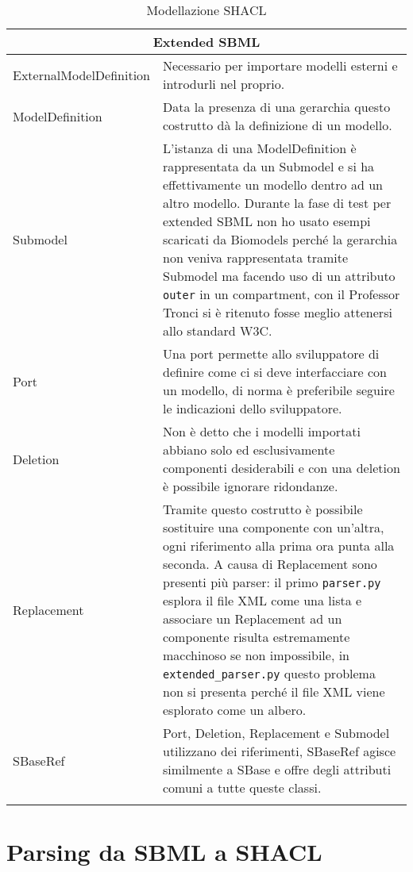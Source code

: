 \documentclass{article}
\begin{document}
\begin{longtable}{p{}p{}}
    \hline 
    \multicolumn{2}{c}{Extended SBML} \\
    \hline
    ExternalModelDefinition &  Necessario per importare modelli esterni e introdurli nel proprio. \\
    \hline
    ModelDefinition & Data la presenza di una gerarchia questo costrutto dà la definizione di un modello. \\ 
    \hline
    Submodel & L'istanza di una ModelDefinition è rappresentata da un Submodel e si ha effettivamente un modello dentro ad un altro modello. Durante la fase di test per extended SBML non ho usato esempi scaricati da Biomodels perché la gerarchia non veniva rappresentata tramite Submodel ma facendo uso di un attributo \texttt{outer} in un compartment, con il Professor Tronci si è ritenuto fosse meglio attenersi allo standard W3C. \\ 
    \hline
    Port & Una port permette allo sviluppatore di definire come ci si deve interfacciare con un modello, di norma è preferibile seguire le indicazioni dello sviluppatore. \\ 
    \hline
    Deletion & Non è detto che i modelli importati abbiano solo ed esclusivamente componenti desiderabili e con una deletion è possibile ignorare ridondanze. \\
    \hline
    Replacement & Tramite questo costrutto è possibile sostituire una componente con un'altra, ogni riferimento alla prima ora punta alla seconda. A causa di Replacement sono presenti più parser: il primo \texttt{parser.py} esplora il file XML come una lista e associare un Replacement ad un componente risulta estremamente macchinoso se non impossibile, in \texttt{extended\_parser.py} questo problema non si presenta perché il file XML viene esplorato come un albero. \\
    \hline
    SBaseRef & Port, Deletion, Replacement e Submodel utilizzano dei riferimenti, SBaseRef agisce similmente a SBase e offre degli attributi comuni a tutte queste classi. \\
    \hline

    \caption{Modellazione SHACL}
    \label{tab:modellazione}
\end{longtable}

\section{Parsing da SBML a SHACL}
\end{document}
